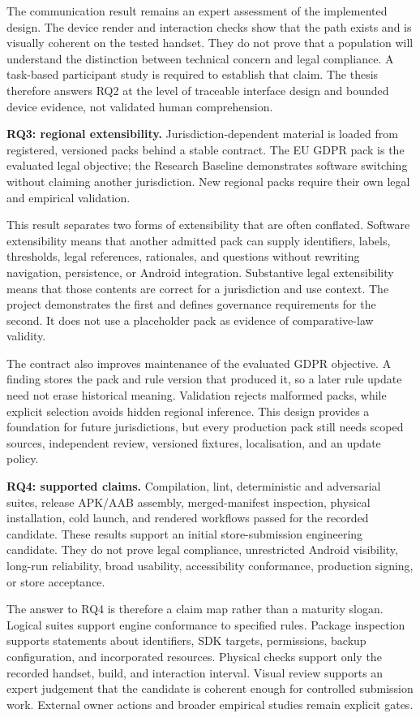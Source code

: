 The communication result remains an expert assessment of the implemented design. The device render and interaction checks show that the path exists and is visually coherent on the tested handset. They do not prove that a population will understand the distinction between technical concern and legal compliance. A task-based participant study is required to establish that claim. The thesis therefore answers RQ2 at the level of traceable interface design and bounded device evidence, not validated human comprehension.

\textbf{RQ3: regional extensibility.} Jurisdiction-dependent material is loaded from registered, versioned packs behind a stable contract. The EU GDPR pack is the evaluated legal objective; the Research Baseline demonstrates software switching without claiming another jurisdiction. New regional packs require their own legal and empirical validation.

This result separates two forms of extensibility that are often conflated. Software extensibility means that another admitted pack can supply identifiers, labels, thresholds, legal references, rationales, and questions without rewriting navigation, persistence, or Android integration. Substantive legal extensibility means that those contents are correct for a jurisdiction and use context. The project demonstrates the first and defines governance requirements for the second. It does not use a placeholder pack as evidence of comparative-law validity.

The contract also improves maintenance of the evaluated GDPR objective. A finding stores the pack and rule version that produced it, so a later rule update need not erase historical meaning. Validation rejects malformed packs, while explicit selection avoids hidden regional inference. This design provides a foundation for future jurisdictions, but every production pack still needs scoped sources, independent review, versioned fixtures, localisation, and an update policy.

\textbf{RQ4: supported claims.} Compilation, lint, deterministic and adversarial suites, release APK/AAB assembly, merged-manifest inspection, physical installation, cold launch, and rendered workflows passed for the recorded candidate. These results support an initial store-submission engineering candidate. They do not prove legal compliance, unrestricted Android visibility, long-run reliability, broad usability, accessibility conformance, production signing, or store acceptance.

The answer to RQ4 is therefore a claim map rather than a maturity slogan. Logical suites support engine conformance to specified rules. Package inspection supports statements about identifiers, SDK targets, permissions, backup configuration, and incorporated resources. Physical checks support only the recorded handset, build, and interaction interval. Visual review supports an expert judgement that the candidate is coherent enough for controlled submission work. External owner actions and broader empirical studies remain explicit gates.

